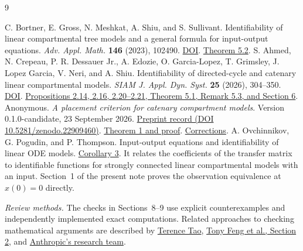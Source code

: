 \documentclass[11pt,a4paper]{article}
\begin{document}
\smallskip
\begin{thebibliography}{9}

 C. Bortner, E. Gross, N. Meshkat, A. Shiu, and S. Sullivant. Identifiability of linear compartmental tree models and a general formula for input-output equations. \emph{Adv. Appl. Math.} \textbf{146} (2023), 102490. \href{https://doi.org/10.1016/j.aam.2023.102490}{DOI}. \href{https://arxiv.org/pdf/2106.08487\#page=28}{Theorem 5.2}.
 S. Ahmed, N. Crepeau, P. R. Dessauer Jr., A. Edozie, O. Garcia-Lopez, T. Grimsley, J. Lopez Garcia, V. Neri, and A. Shiu. Identifiability of directed-cycle and catenary linear compartmental models. \emph{SIAM J. Appl. Dyn. Syst.} \textbf{25} (2026), 304--350. \href{https://doi.org/10.1137/25M1728636}{DOI}. \href{https://arxiv.org/html/2412.05283v3}{Propositions 2.14, 2.16, 2.20--2.21, Theorem 5.1, Remark 5.3, and Section 6}.
 Anonymous. \emph{A placement criterion for catenary compartment models}. Version 0.1.0-candidate, 23 September 2026. \href{https://zenodo.org/records/22909460}{Preprint record (DOI 10.5281/zenodo.22909460)}. \href{https://github.com/ipitchford/catenary-placement-classification/blob/v0.1.0-candidate/paper.md}{Theorem 1 and proof}. \href{https://github.com/ipitchford/catenary-placement-classification/blob/main/CORRECTIONS.md}{Corrections}.
 A. Ovchinnikov, G. Pogudin, and P. Thompson. Input-output equations and identifiability of linear ODE models. \href{https://arxiv.org/abs/1910.03960}{Corollary 3}. It relates the coefficients of the transfer matrix to identifiable functions for strongly connected linear compartmental models with an input. Section~1 of the present note proves the observation equivalence at \(x(0)=0\) directly.


\end{thebibliography}

\medskip\noindent\emph{Review methods.} The checks in Sections~8--9 use explicit counterexamples and independently implemented exact computations. Related approaches to checking mathematical arguments are described by \href{https://terrytao.wordpress.com/advice-on-writing-papers/on-local-and-global-errors-in-mathematical-papers-and-how-to-detect-them/}{Terence Tao}, \href{https://arxiv.org/html/2602.10177v3\#S2}{Tony Feng et al., Section 2}, and \href{https://www.anthropic.com/research/riemann-zeta}{Anthropic's research team}.
\end{document}
